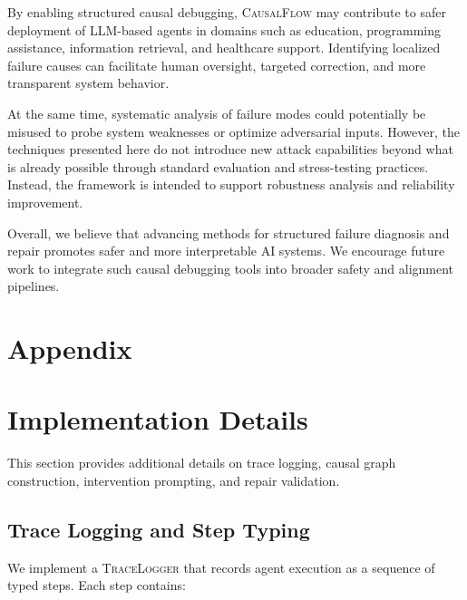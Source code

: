 \documentclass{article}
\theoremstyle{plain}
\theoremstyle{definition}
\theoremstyle{remark}
\begin{document}
By enabling structured causal debugging, \textsc{CausalFlow} may contribute to safer deployment of LLM-based agents in domains such as education, programming assistance, information retrieval, and healthcare support. Identifying localized failure causes can facilitate human oversight, targeted correction, and more transparent system behavior.

At the same time, systematic analysis of failure modes could potentially be misused to probe system weaknesses or optimize adversarial inputs. However, the techniques presented here do not introduce new attack capabilities beyond what is already possible through standard evaluation and stress-testing practices. Instead, the framework is intended to support robustness analysis and reliability improvement.

Overall, we believe that advancing methods for structured failure diagnosis and repair promotes safer and more interpretable AI systems. We encourage future work to integrate such causal debugging tools into broader safety and alignment pipelines.






\newpage

\appendix
\section*{Appendix}

\section{Implementation Details}

This section provides additional details on trace logging, causal graph construction, intervention prompting, and repair validation.

\subsection{Trace Logging and Step Typing}

We implement a \textsc{TraceLogger} that records agent execution as a sequence of typed steps. Each step contains:
\end{document}
